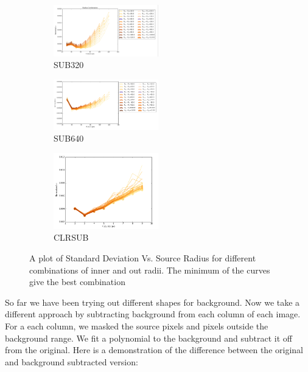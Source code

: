 \documentclass[conference]{IEEEtran}
\begin{document}
        \begin{figure}[H]
            \centering
            \begin{subfigure}{1}
                \includegraphics[width = 0.5\textwidth]{Combo}
                \caption{SUB320}
            \end{subfigure}
        
            \begin{subfigure}{2}
                \includegraphics[width = 0.5\textwidth]{Radius_640}
                \caption{SUB640}
            \end{subfigure}
            
            \begin{subfigure}{3}
                \includegraphics[width = 0.5\textwidth]{Radius_CLR}
                \caption{CLRSUB}
            \end{subfigure}
            \caption{A plot of Standard Deviation Vs. Source Radius for different combinations of inner and out radii. The minimum of the curves give the best combination}
        \end{figure}
        
        So far we have been trying out different shapes for background. Now we take a different approach by subtracting background from each column of each image. For a each column, we masked the source pixels and pixels outside the background range. We fit a polynomial to the background and subtract it off from the original. Here is a demonstration of the difference between the original and background subtracted version:
        
\end{document}
